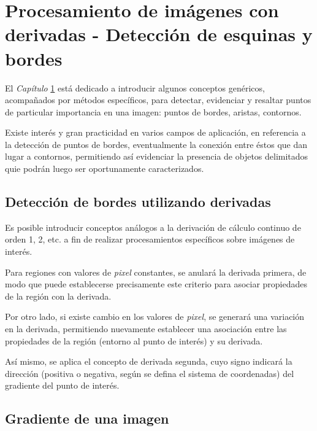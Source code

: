 \chapter{Procesamiento de im\'agenes con derivadas - Detecci\'on de esquinas y bordes}
\label{CapV}

El \textit{Cap\'itulo} \ref{CapV} est\'a dedicado a introducir algunos conceptos gen\'ericos, acompa\~nados por m\'etodos espec\'ificos,
para detectar, evidenciar y resaltar puntos de particular importancia en una imagen: puntos de bordes, aristas, contornos.

%

Existe inter\'es y gran practicidad en varios campos de aplicaci\'on, en referencia a la detecci\'on de puntos de bordes, eventualmente la
conexi\'on entre \'estos que dan lugar a contornos, permitiendo as\'i evidenciar la presencia de objetos delimitados quie podr\'an luego 
ser oportunamente caracterizados.

\section{Detecci\'on de bordes utilizando derivadas}
\label{CapV_1}

Es posible introducir conceptos an\'alogos a la derivaci\'on de c\'alculo continuo de orden 1, 2, etc. a fin de realizar procesamientos
espec\'ificos sobre im\'agenes de inter\'es.

Para regiones con valores de \textit{pixel} constantes, se anular\'a la derivada primera, de modo que puede establecerse precisamente este
criterio para asociar propiedades de la regi\'on con la derivada. 

Por otro lado, si existe cambio en los valores de \textit{pixel}, se generar\'a una variaci\'on en la derivada, permitiendo nuevamente 
establecer una asociaci\'on entre las propiedades de la regi\'on (entorno al punto de inter\'es) y su derivada.

As\'i mismo, se aplica el concepto de derivada segunda, cuyo signo indicar\'a la direcci\'on (positiva o negativa, seg\'un se defina el 
sistema de coordenadas) del gradiente del punto de inter\'es.

\section{Gradiente de una imagen}
\label{CapV_2}


